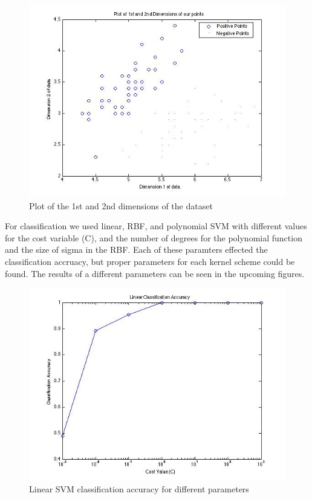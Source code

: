 \documentclass[paper=a4, fontsize=11pt]{scrartcl} %
\begin{document}
\begin{figure}[h]
\centering
\includegraphics[scale=0.4]{serperability.jpg}
\caption{Plot of the 1st and 2nd dimensions of the dataset}
\label{fig:plot_2d}
\end{figure}

For classification we used linear, RBF, and polynomial SVM with different values for the cost variable (C), and the number of degrees for the polynomial function and the size of sigma in the RBF.
Each of these paramters effected the classification accruacy, but proper parameters for each kernel scheme could be found.
The results of a different parameters can be seen in the upcoming figures.

\begin{figure}
\centering
\includegraphics[scale=0.4]{linear.jpg}
\caption{Linear SVM classification accuracy for different parameters}
\label{fig:plot_2d}
\end{figure}
\end{document}
